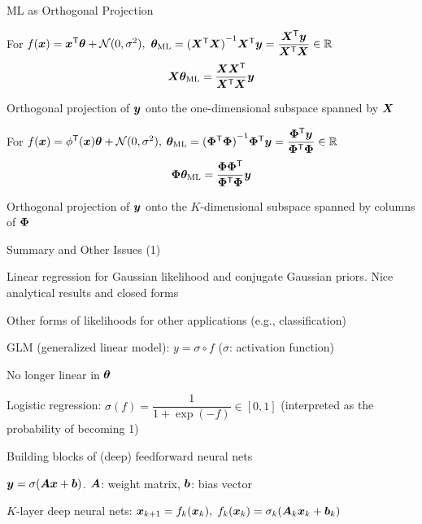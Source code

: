 \documentclass[handout,fleqn,aspectratio=169]{beamer}
\begin{document}
\begin{frame}{ML as Orthogonal Projection}

\plitemsep 0.07in

\bci 

\item For $f(\bm{x}) = {\bm{x}}^{\mathsf{T}}\bm{\theta} + \mathcal N(0,\sigma^2),$ $\bm{\theta}_{\text{ML}} = {{({\bm{X}}^{\mathsf{T}}\bm{X})}^{-1}} {\bm{X}}^{\mathsf{T}} \bm{y} = \dfrac{{\bm{X}}^{\mathsf{T}}\bm{y}}{{\bm{X}}^{\mathsf{T}}\bm{X}} \in {\mathbb R}$
$$
\bm{X}\bm{\theta}_{\text{ML}} =  \dfrac{\bm{X}{\bm{X}}^{\mathsf{T}}}{{\bm{X}}^{\mathsf{T}}\bm{X}}\bm{y}
$$
\vspace{-0.3cm}
\bci
\item Orthogonal projection of $\bm{y}$ onto the one-dimensional subspace spanned by $\bm{X}$
\eci


\item For $f(\bm{x}) = {\phi}^{\mathsf{T}}(\bm{x})\bm{\theta} + \mathcal N(0,\sigma^2),$ $\bm{\theta}_{\text{ML}} = {{({\bm{\Phi}}^{\mathsf{T}}\bm{\Phi})}^{-1}} {\bm{\Phi}}^{\mathsf{T}} \bm{y} = \dfrac{{\bm{\Phi}}^{\mathsf{T}}\bm{y}}{{\bm{\Phi}}^{\mathsf{T}}\bm{\Phi}} \in {\mathbb R}$
$$
\bm{\Phi}\bm{\theta}_{\text{ML}} =  \dfrac{\bm{\Phi}{\bm{\Phi}}^{\mathsf{T}}}{{\bm{\Phi}}^{\mathsf{T}}\bm{\Phi}}\bm{y}
$$
\vspace{-0.3cm}
\bci
\item Orthogonal projection of $\bm{y}$ onto the $K$-dimensional subspace spanned by columns of $\bm{\Phi}$
\eci
\eci
\end{frame}

\begin{frame}{Summary and Other Issues (1)}

\plitemsep 0.07in

\bci 

\item Linear regression for Gaussian likelihood and conjugate Gaussian priors. Nice analytical results and closed forms 

\item Other forms of likelihoods for other applications (e.g., classification)

\item GLM (generalized linear model): $y = \sigma \circ f$ ($\sigma$: activation function)
\bci
\item No longer linear in $\bm{\theta}$
\item Logistic regression: $\sigma(f) = \dfrac{1}{1+\exp(-f)} \in [0,1]$ (interpreted as the probability of becoming 1)
\item Building blocks of (deep) feedforward neural nets

\item $\bm{y} = \sigma(\bm{A} \bm{x} + \bm{b})$. $\bm{A}$: weight matrix, $\bm{b}$: bias vector
\item $K$-layer deep neural nets: $\bm{x}_{k+1} = f_k(\bm{x}_k),$ $f_k(\bm{x}_k) = \sigma_k(\bm{A}_k\bm{x}_k + \bm{b}_k)$
\eci

\eci
\end{frame}
\end{document}
